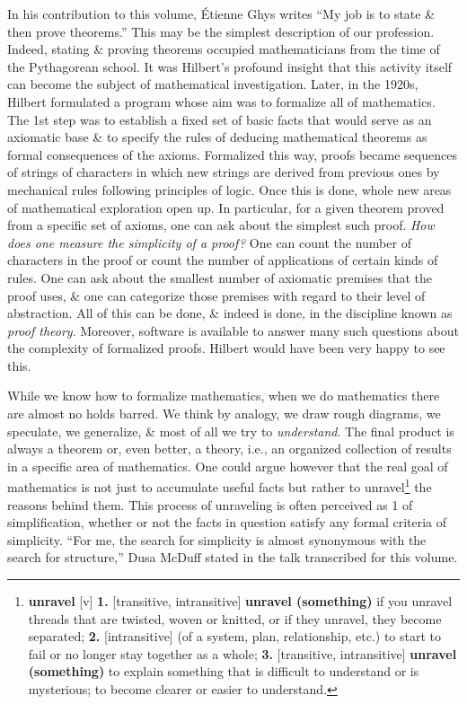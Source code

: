 \documentclass[oneside]{book}
\numberwithin{equation}{section}
\begin{document}
In his contribution to this volume, \'Etienne Ghys writes ``My job is to state \& then prove theorems.'' This may be the simplest description of our profession. Indeed, stating \& proving theorems occupied mathematicians from the time of the Pythagorean school. It was Hilbert's profound insight that this activity itself can become the subject of mathematical investigation. Later, in the 1920s, Hilbert formulated a program whose aim was to formalize all of mathematics. The 1st step was to establish a fixed set of basic facts that would serve as an axiomatic base \& to specify the rules of deducing mathematical theorems as formal consequences of the axioms. Formalized this way, proofs became sequences of strings of characters in which new strings are derived from previous ones by mechanical rules following principles of logic. Once this is done, whole new areas of mathematical exploration open up. In particular, for a given theorem proved from a specific set of axioms, one can ask about the simplest such proof. \textit{How does one measure the simplicity of a proof?} One can count the number of characters in the proof or count the number of applications of certain kinds of rules. One can ask about the smallest number of axiomatic premises that the proof uses, \& one can categorize those premises with regard to their level of abstraction. All of this can be done, \& indeed is done, in the discipline known as \textit{proof theory}. Moreover, software is available to answer many such questions about the complexity of formalized proofs. Hilbert would have been very happy to see this.

While we know how to formalize mathematics, when we do mathematics there are almost no holds barred. We think by analogy, we draw rough diagrams, we speculate, we generalize, \& most of all we try to \textit{understand}. The final product is always a theorem or, even better, a theory, i.e., an organized collection of results in a specific area of mathematics. One could argue however that the  real goal of mathematics is not just to accumulate useful facts but rather to unravel\footnote{\textbf{unravel} [v] \textbf{1.} [transitive, intransitive] \textbf{unravel (something)} if you unravel threads that are twisted, woven or knitted, or if they unravel, they become separated; \textbf{2.} [intransitive] (of a system, plan, relationship, etc.) to start to fail or no longer stay together as a whole; \textbf{3.} [transitive, intransitive] \textbf{unravel (something)} to explain something that is difficult to understand or is mysterious; to become clearer or easier to understand.} the reasons behind them. This process of unraveling is often perceived as 1 of simplification, whether or not the facts in question satisfy any formal criteria of simplicity. ``For me, the search for simplicity is almost synonymous with the search for structure,'' Dusa McDuff stated in the talk transcribed for this volume.
\end{document}
